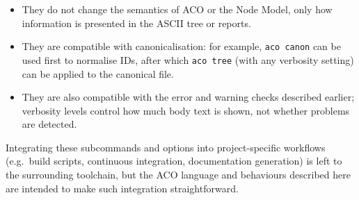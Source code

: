 \documentclass[11pt]{article}
\begin{document}
\begin{itemize}[leftmargin=2em]
  \item They do not change the semantics of ACO or the Node Model, only how information is presented in the ASCII tree or reports.
  \item They are compatible with canonicalisation: for example, \texttt{aco canon} can be used first to normalise IDs, after which \texttt{aco tree} (with any verbosity setting) can be applied to the canonical file.
  \item They are also compatible with the error and warning checks described earlier; verbosity levels control how much body text is shown, not whether problems are detected.
\end{itemize}

Integrating these subcommands and options into project-specific workflows (e.g.\ build scripts, continuous integration, documentation generation) is left to the surrounding toolchain, but the ACO language and behaviours described here are intended to make such integration straightforward.
\endgroup
\end{document}
